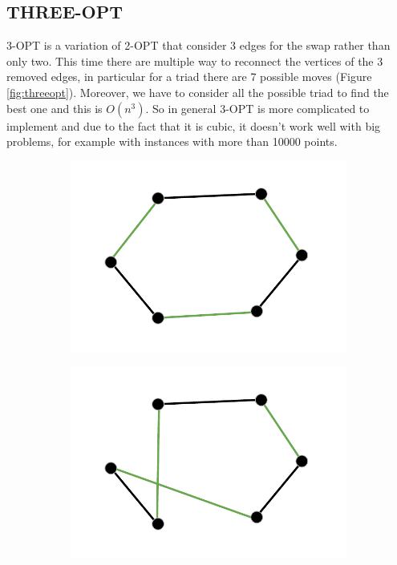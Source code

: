 \subsection{THREE-OPT}
3-OPT is a variation of 2-OPT that consider 3 edges for the swap rather than only two. This time there are multiple way to reconnect the vertices of the 3 removed edges, in particular for a triad there are 7 possible moves (Figure  \ref{fig:threeopt}). Moreover, we have to consider all the possible triad to find the best one and this is $O(n^3)$. So in general 3-OPT is more complicated to implement and due to the fact that it is cubic, it doesn't work well with big problems, for example with instances with more than 10000 points.

\begin{figure}[h!]
  \centering
  \begin{subfigure}[b]{0.24\linewidth}
    \includegraphics[width=\linewidth]{media/threeopt1.pdf}
     \caption{}
  \end{subfigure}
  \begin{subfigure}[b]{0.24\linewidth}
    \includegraphics[width=\linewidth]{media/threeopt2.pdf}

\end{subfigure}
\end{figure}
